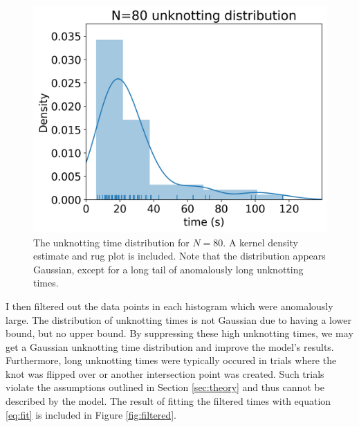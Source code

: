 \documentclass[11pt]{article}
\begin{document}
        \begin{figure}[H]
            \centering
            \includegraphics[scale=0.52]{N=80.png}
            \caption{The unknotting time distribution for $N=80$. A kernel density 
            estimate and rug plot is included. Note that the distribution appears Gaussian,
            except for a long tail of anomalously long unknotting times.}
            \label{fig:hist}
        \end{figure}
    I then filtered out the data points in each histogram which were anomalously large. The distribution 
    of unknotting times is not Gaussian due to having a lower bound, but no upper bound. By suppressing
    these high unknotting times, we may get a Gaussian unknotting time distribution and improve the model's results.
    Furthermore, long unknotting times were typically occured in trials where the knot was flipped over or another 
    intersection point was created. Such trials violate the assumptions outlined in Section \ref{sec:theory} and thus 
    cannot be described by the model. The result of fitting the filtered times with equation \ref{eq:fit} is included in Figure 
    \ref{fig:filtered}.
\end{document}
